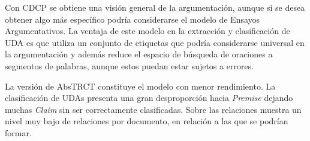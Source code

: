 Con CDCP se obtiene una visión general de la argumentación, aunque si se desea obtener algo 
más específico podría considerarse el modelo de Ensayos Argumentativos. La ventaja de este 
modelo en la extracción y clasificación de UDA es que utiliza un conjunto de etiquetas que 
podría considerarse universal en la argumentación y además reduce el espacio de búsqueda de 
oraciones a segmentos de palabras, aunque estos puedan estar sujetos a errores. 

La versión de AbsTRCT constituye el modelo con menor rendimiento. La clasificación
de UDAs presenta una gran desproporción hacia \emph{Premise} dejando muchas \emph{Claim}
sin ser correctamente clasificadas. Sobre las relaciones muestra un nivel muy bajo de 
relaciones por documento, en relación a las que se podrían formar.
